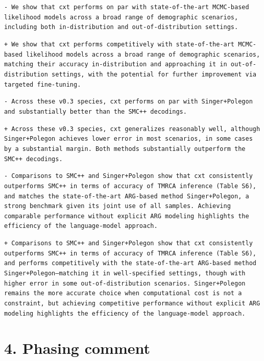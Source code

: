 \documentclass[10pt]{article}
\newcommand{\rem}[1]{\par\noindent\colorbox{rembg}{\parbox{\dimexpr\linewidth-2\fboxsep}{\small\textcolor{remtext}{\texttt{-\ #1}}}}}
\newcommand{\add}[1]{\par\noindent\colorbox{addbg}{\parbox{\dimexpr\linewidth-2\fboxsep}{\small\textcolor{addtext}{\texttt{+\ #1}}}}}
\newcommand{\ctx}[1]{\par\noindent{\parbox{\linewidth}{\small\textcolor{ctxtext}{\texttt{\ \ #1}}}}}
\begin{document}
\begin{mdframed}[style=diffbox]
\ctx{Abstract:}
\rem{We show that cxt performs on par with state-of-the-art MCMC-based likelihood models across a broad range of demographic scenarios, including both in-distribution and out-of-distribution settings.}
\add{We show that cxt performs competitively with state-of-the-art MCMC-based likelihood models across a broad range of demographic scenarios, matching their accuracy in-distribution and approaching it in out-of-distribution settings, with the potential for further improvement via targeted fine-tuning.}
\vspace{4pt}
\ctx{Out-of-sample results:}
\rem{Across these v0.3 species, cxt performs on par with Singer+Polegon and substantially better than the SMC++ decodings.}
\add{Across these v0.3 species, cxt generalizes reasonably well, although Singer+Polegon achieves lower error in most scenarios, in some cases by a substantial margin. Both methods substantially outperform the SMC++ decodings.}
\vspace{4pt}
\ctx{Discussion:}
\rem{Comparisons to SMC++ and Singer+Polegon show that cxt consistently outperforms SMC++ in terms of accuracy of TMRCA inference (Table S6), and matches the state-of-the-art ARG-based method Singer+Polegon, a strong benchmark given its joint use of all samples. Achieving comparable performance without explicit ARG modeling highlights the efficiency of the language-model approach.}
\add{Comparisons to SMC++ and Singer+Polegon show that cxt consistently outperforms SMC++ in terms of accuracy of TMRCA inference (Table S6), and performs competitively with the state-of-the-art ARG-based method Singer+Polegon---matching it in well-specified settings, though with higher error in some out-of-distribution scenarios. Singer+Polegon remains the more accurate choice when computational cost is not a constraint, but achieving competitive performance without explicit ARG modeling highlights the efficiency of the language-model approach.}
\end{mdframed}


\section*{\textcolor{accent}{4. Phasing comment}}
\end{document}
